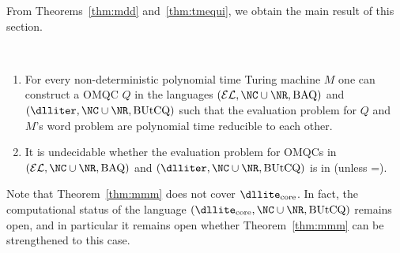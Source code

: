 \documentclass{lmcs}
\theoremstyle{definition}
\begin{document}
From Theorems~\ref{thm:mdd} and~\ref{thm:tmequi}, we obtain the main result of this section.
%
\begin{thm}\label{thm:mmm}~\\[-4mm]
\begin{enumerate}
\item For every non-deterministic polynomial time Turing machine $M$ one can construct a OMQC $Q$ in the languages
$(\mathcal{EL},\NC\cup\NR,\text{BAQ})$ and $(\dlliter,\NC\cup \NR,\text{BUtCQ})$
such that the evaluation problem for $Q$ and $M$'s word problem are polynomial time reducible to each other. 
\item It is undecidable whether the evaluation problem for OMQCs in
$(\mathcal{EL},\NC\cup\NR,\text{BAQ})$ and $(\dlliter,\NC\cup \NR,\text{BUtCQ})$ is in \ptime (unless \ptime=\np).
\end{enumerate}
\end{thm}
Note that Theorem~\ref{thm:mmm} does not cover $\text{\dllite}_{\text{core}}$. In fact,
the computational status of the language $(\text{\dllite}_{\text{core}},\NC \cup
\NR,\text{BUtCQ})$ remains open, and in particular it remains open whether
Theorem~\ref{thm:mmm} can be strengthened to this case.%
\end{document}
